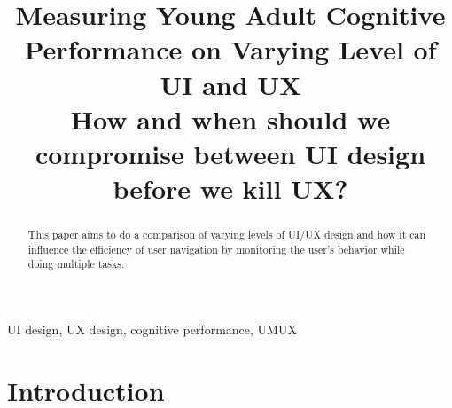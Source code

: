 \documentclass[conference]{IEEEtran}
\begin{document}
\title{Measuring Young Adult Cognitive Performance on Varying Level of UI and UX\\
{\footnotesize{} How and when should we compromise between UI design before we kill UX?}
}

\author{
    \and
    \and
}

\maketitle

\begin{abstract}
    This paper aims to do a comparison of varying levels of UI/UX design and how it can influence the efficiency of user navigation by monitoring the user's behavior while doing multiple tasks.
\end{abstract}

\begin{IEEEkeywords}
    UI design, UX design, cognitive performance, UMUX
\end{IEEEkeywords}

\section{Introduction}

\end{document}
